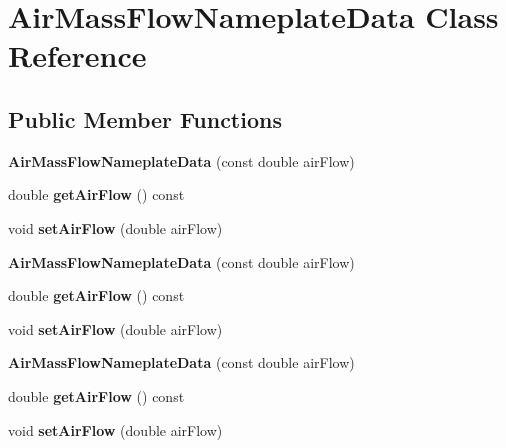 \hypertarget{class_air_mass_flow_nameplate_data}{}\section{Air\+Mass\+Flow\+Nameplate\+Data Class Reference}
\label{class_air_mass_flow_nameplate_data}
\subsection*{Public Member Functions}
\begin{DoxyCompactItemize}
\item 
\mbox{\label{class_air_mass_flow_nameplate_data_a5c51861e500173cb64755a39d6222fec}} 
{\bfseries Air\+Mass\+Flow\+Nameplate\+Data} (const double air\+Flow)
\item 
\mbox{\label{class_air_mass_flow_nameplate_data_a86d39b299837beafcd1de06607bd3a77}} 
double {\bfseries get\+Air\+Flow} () const
\item 
\mbox{\label{class_air_mass_flow_nameplate_data_a05b1efbb363b78cd71a46ea069e90314}} 
void {\bfseries set\+Air\+Flow} (double air\+Flow)
\item 
\mbox{\label{class_air_mass_flow_nameplate_data_a5c51861e500173cb64755a39d6222fec}} 
{\bfseries Air\+Mass\+Flow\+Nameplate\+Data} (const double air\+Flow)
\item 
\mbox{\label{class_air_mass_flow_nameplate_data_a86d39b299837beafcd1de06607bd3a77}} 
double {\bfseries get\+Air\+Flow} () const
\item 
\mbox{\label{class_air_mass_flow_nameplate_data_a05b1efbb363b78cd71a46ea069e90314}} 
void {\bfseries set\+Air\+Flow} (double air\+Flow)
\item 
\mbox{\label{class_air_mass_flow_nameplate_data_a5c51861e500173cb64755a39d6222fec}} 
{\bfseries Air\+Mass\+Flow\+Nameplate\+Data} (const double air\+Flow)
\item 
\mbox{\label{class_air_mass_flow_nameplate_data_a86d39b299837beafcd1de06607bd3a77}} 
double {\bfseries get\+Air\+Flow} () const
\item 
\mbox{\label{class_air_mass_flow_nameplate_data_a05b1efbb363b78cd71a46ea069e90314}} 
void {\bfseries set\+Air\+Flow} (double air\+Flow)
\end{DoxyCompactItemize}


